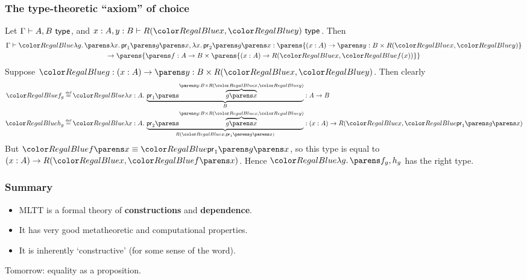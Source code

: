 \documentclass[handout]{beamer} %
\begin{document}
\begin{frame}
  \frametitle{The type-theoretic ``axiom'' of choice}
  
  Let $\IsTy{A, B}[]$, and $\IsTy[x : A, y : B]{R(\Tm{x}, \Tm{y})}[]$. Then
  \begin{multline*}
    \IsTm{
      \Lam{g}{
        \Pair{
          \Lam{x}{\Proj[1]{\App{g}{x}}}
        }{
          \Lam{x}{\Proj[2]{\App{g}{x}}}
        }
      }
    }{
      \parens{\Fn{x}{A}{\DSum{y}{B}{R(\Tm{x}, \Tm{y})}}} \\ 
      \to \parens{ \DSum{f}{A \to B}{\parens{\Fn{x}{A}{R(\Tm{x}, \Tm{f(x)})}}} }
    } 
  \end{multline*}
  Suppose $\Tm{g} : \Fn{x}{A}{\DSum{y}{B}{R(\Tm{x}, \Tm{y})}}$. Then clearly
  \begin{align*}
    \Tm{f_g} &\defeq \Tm{
      \Lam{x}[A]{
        \underbrace{\Proj[1]{\overbrace{\App{g}{x}}^{\DSum{y}{B}{R(\Tm{x}, \Tm{y})}}}}_{B}
      }
    } : A \to B 
    \\
    \Tm{h_g} &\defeq \Tm{
      \Lam{x}[A]{
        \underbrace{\Proj[2]{\overbrace{\App{g}{x}}^{\DSum{y}{B}{R(\Tm{x}, \Tm{y})}}}}_{
          R(\Tm{x}, \Proj[1]{\App{g}{x}})
        }
      } 
    } : \Fn{x}{A}{R(\Tm{x}, \Tm{\Proj[1]{\App{g}{x}}})}
  \end{align*}
  But $\Tm{\App{f}{x}} \equiv \Tm{\Proj[1]{\App{g}{x}}}$, so this type is equal
  to $\Fn{x}{A}{R(\Tm{x}, \Tm{\App{f}{x}})}$. Hence $\Tm{\Lam{g}{\Pair{f_g}{h_g}}}$ has the
  right type.
  
\end{frame}

\begin{frame}
  \frametitle{Summary}
  \begin{itemize}
    \item MLTT is a formal theory of \textbf{constructions} and \textbf{dependence}.
    \item It has very good metatheoretic and computational properties.
    \item It is inherently `constructive' (for some sense of the word).
  \end{itemize}
  
  \medskip

  Tomorrow: equality as a proposition.
\end{frame}
\end{document}
